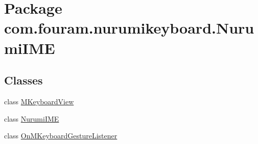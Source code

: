 \hypertarget{namespacecom_1_1fouram_1_1nurumikeyboard_1_1_nurumi_i_m_e}{}\section{Package com.\+fouram.\+nurumikeyboard.\+Nurumi\+I\+M\+E}
\label{namespacecom_1_1fouram_1_1nurumikeyboard_1_1_nurumi_i_m_e}
\subsection*{Classes}
\begin{DoxyCompactItemize}
\item 
class \hyperlink{classcom_1_1fouram_1_1nurumikeyboard_1_1_nurumi_i_m_e_1_1_m_keyboard_view}{M\+Keyboard\+View}
\item 
class \hyperlink{classcom_1_1fouram_1_1nurumikeyboard_1_1_nurumi_i_m_e_1_1_nurumi_i_m_e}{Nurumi\+I\+M\+E}
\item 
class \hyperlink{interfacecom_1_1fouram_1_1nurumikeyboard_1_1_nurumi_i_m_e_1_1_on_m_keyboard_gesture_listener}{On\+M\+Keyboard\+Gesture\+Listener}
\end{DoxyCompactItemize}
